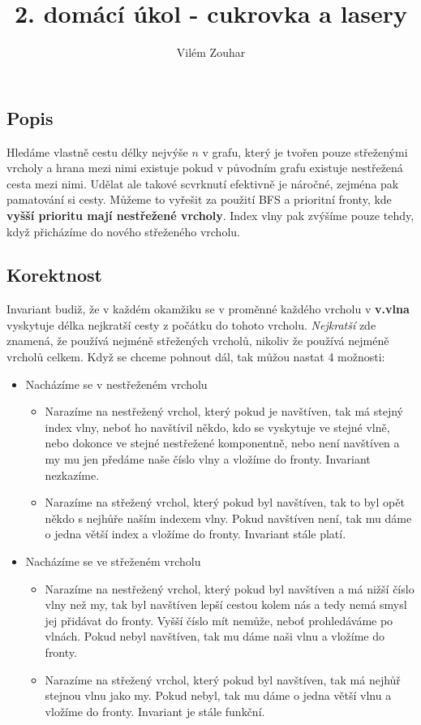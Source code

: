 \documentclass[a4paper]{article}
\title{2. domácí úkol - cukrovka a lasery}
\author{Vilém Zouhar}
\date{}
\begin{document}
\vspace{-4cm}
\maketitle
\section{}
\subsection{Popis}
Hledáme vlastně cestu délky nejvýše $n$ v grafu, který je tvořen pouze střeženými vrcholy a hrana mezi nimi existuje pokud v původním grafu existuje nestřežená cesta mezi nimi. Udělat ale takové scvrknutí efektivně je náročné, zejména pak pamatování si cesty.
Můžeme to vyřešit za použití BFS a prioritní fronty, kde \textbf{vyšší prioritu mají nestřežené vrcholy}. Index vlny pak zvýšíme pouze tehdy, když přicházíme do nového střeženého vrcholu.
\subsection{Korektnost}
Invariant budiž, že v každém okamžiku se v proměnné každého vrcholu v \textbf{v.vlna} vyskytuje délka nejkratší cesty z počátku do tohoto vrcholu. \textit{Nejkratší} zde znamená, že používá nejméně střežených vrcholů, nikoliv že používá nejméně vrcholů celkem. Když se chceme pohnout dál, tak můžou nastat 4 možnosti:
\begin{itemize}
  \item Nacházíme se v nestřeženém vrcholu\begin{itemize}
 \item Narazíme na nestřežený vrchol, který pokud je navštíven, tak má stejný index vlny, neboť ho navštívil někdo, kdo se vyskytuje ve stejné vlně, nebo dokonce ve stejné nestřežené komponentně, nebo není navštíven a my mu jen předáme naše číslo vlny a vložíme do fronty. Invariant nezkazíme.
    \item Narazíme na střežený vrchol, který pokud byl navštíven, tak to byl opět někdo s nejhůře naším indexem vlny. Pokud navštíven není, tak mu dáme o jedna větší index a vložíme do fronty. Invariant stále platí. 
  \end{itemize}
  \item Nacházíme se ve střeženém vrcholu\begin{itemize}
 \item Narazíme na nestřežený vrchol, který pokud byl navštíven a má nižší číslo vlny než my, tak byl navštíven lepší cestou kolem nás a tedy nemá smysl jej přidávat do fronty. Vyšší číslo mít nemůže, neboť prohledáváme po vlnách. Pokud nebyl navštíven, tak mu dáme naši vlnu a vložíme do fronty.
    \item Narazíme na střežený vrchol, který pokud byl navštíven, tak má nejhůř stejnou vlnu jako my. Pokud nebyl, tak mu dáme o jedna větší vlnu a vložíme do fronty. Invariant je stále funkční.
  \end{itemize}
\end{itemize}
\pagebreak
\end{document}

